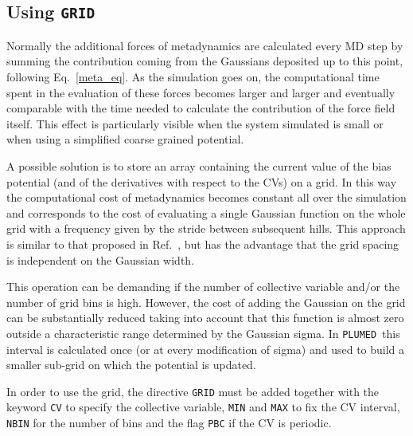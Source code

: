 \documentclass[12pt,fleqn]{report}
\newcommand{\keyword}[1]{\index{Keywords!{\tt #1}} {\tt #1}}
\newcommand{\plumed}{{\tt PLUMED}}
\newcommand{\esempio}[1]{
\vspace{10pt}
\begin{flushright}
\colorbox{light-gray}{
   \begin{minipage}{13cm}
       \scriptsize{
{\fontfamily{phv} \fontseries{b}
 \selectfont Example. \\
 \fontseries{m} \selectfont #1 } }
\end{minipage}}
\end{flushright}
\vspace{20pt}
}
\begin{document}


\subsection{Using {\tt GRID}} 
\label{grid}
Normally the additional forces of metadynamics are calculated every MD step by summing
the contribution coming from the Gaussians deposited up to this point, following Eq.~\ref{meta_eq}. 
As the simulation goes on, the computational time spent in the evaluation of these 
forces becomes larger and larger and eventually comparable with the time needed to 
calculate the contribution of the force field itself.
This effect is particularly  visible when the system  simulated is small or when using a simplified
coarse grained potential.

A possible solution is to store an array containing the current value of the bias potential (and of the
derivatives with respect to the CVs) on a grid.
In this way the computational cost of metadynamics becomes constant all over the simulation and corresponds
to the cost of evaluating a single Gaussian function on the whole grid with a frequency given by the
stride between subsequent hills.
This approach is similar to that proposed in Ref.~\cite{babi+08jcp}, but has the advantage that
the grid spacing is independent on the Gaussian width.

This operation can be demanding if the number of collective variable and/or the number of grid bins is high.
However, the cost of adding the Gaussian on the grid can be substantially reduced 
taking into account that this function is almost zero outside a characteristic range determined by the Gaussian sigma.
In \plumed \ this interval is calculated once (or at every modification of sigma) and used to build a smaller sub-grid on which 
the potential is updated.

In order to use the grid, the directive \keyword{GRID} must be added together with the keyword {\tt CV} to specify
the collective variable, {\tt MIN} and {\tt MAX} to fix  the CV interval, {\tt NBIN} for the number of bins
and the flag {\tt PBC} if the CV is periodic. 
\end{document}
